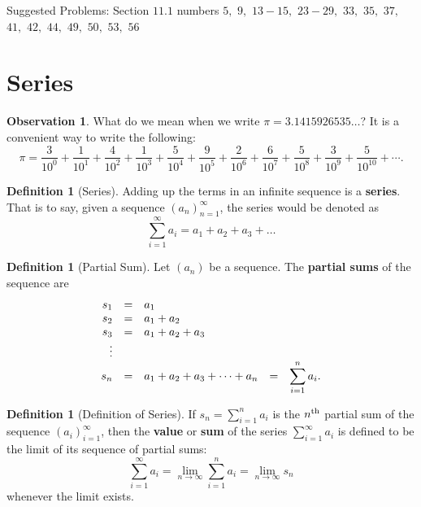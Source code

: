 \documentclass[letterpaper, twoside, 12pt]{book}
\theoremstyle{definition}
\theoremstyle{definition}
\newtheorem{definition}[theorem]{Definition}
\newtheorem{observation}[theorem]{Observation}
\newcommand{\ds}{\ensuremath{\displaystyle}}
\begin{document}
\vspace{3in}

\noindent Suggested Problems: Section $11.1$ numbers $5,$ $9,$ $13 - 15,$ $23 - 29,$ $33,$ $35,$ $37,$ $41,$ $42,$ $44,$ $49,$ $50,$ $53,$ $56$

\newpage

\section{Series}

\begin{observation}
 What do we mean when we write $\pi = 3.1415926535\ldots$?  It is a convenient way to write the following:
 $$\pi = \frac{3}{10^0} + \frac{1}{10^1} + \frac{4}{10^2} + \frac{1}{10^3} + \frac{5}{10^4} + \frac{9}{10^5} + \frac{2}{10^6} + \frac{6}{10^7} + \frac{5}{10^8} + \frac{3}{10^9} + \frac{5}{10^{10}} + \cdots.$$
\end{observation}

\begin{definition}[Series]
 Adding up the terms in an infinite sequence is a \textbf{series}.  That is to say, given a sequence $\left(a_n\right)_{n=1}^\infty$, the series would be denoted as
  \[
    \sum_{i = 1}^{\infty} a_i
    = a_1 + a_2 + a_3 + \dots
  \]
\end{definition}

\begin{definition}[Partial Sum]
  Let $\left( a_n \right)$ be a sequence.  The \textbf{partial sums} of the
  sequence are
  $$\begin{array}{rclcl}
    s_1 &=& a_1 \\
    s_2 &=& a_1 + a_2 \\
    s_3 &=& a_1 + a_2 + a_3 \\
    \vdots \\
    s_n &=& a_1 + a_2 + a_3 + \dots + a_n &=& \ds \sum_{i = 1}^{n} a_i.
   \end{array}$$
\end{definition}

\begin{definition}[Definition of Series]
  If $s_n=\sum_{i=1}^n a_i$ is the $n^{\rm th}$ partial sum of the sequence
  $(a_i)_{i=1}^\infty$, then the \textbf{value} or \textbf{sum} of the series
  $\sum_{i=1}^\infty a_i$ is defined to be the limit of its sequence of
  partial sums:
    \[
      \sum_{i=1}^\infty a_i = \lim_{n\to\infty}\sum_{i=1}^n a_i
      = \lim_{n\to\infty} s_n
    \]
  whenever the limit exists.
\end{definition}
\end{document}
